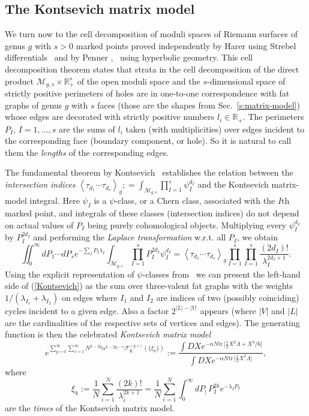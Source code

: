 \documentclass[11pt]{article}
\def\tr{{\mathrm{tr\,}}}
\def\beq{\begin{equation}}
\def\eeq{\end{equation}}
\theoremstyle{plain}
\theoremstyle{definition}
\let\text=\mathrm
\def\beq{\begin{equation}}
\def\eeq{\end{equation}}
\begin{document}
\subsection{The Kontsevich matrix model}\label{ss:Kontsevich}

We turn now to the cell decomposition of moduli spaces of Riemann surfaces of genus $g$ with
$s>0$ marked points proved independently by Harer \cite{HarVir} using Strebel differentials~\cite{Strebel} and by Penner \cite{Penner},~\cite{PenPer} using hyperbolic geometry.  This cell decomposition theorem
states that strata in the cell decomposition of the direct
product ${\mathcal M}_{g,s}\times {\mathbb R}^s_{+}$ of the open moduli space and the $s$-dimensional space of
strictly positive perimeters of holes
are in one-to-one correspondence with fat graphs of genus $g$ with $s$ faces (those are the shapes from
Sec.~\ref{s:matrix-model}) whose edges are decorated with strictly positive numbers $l_i\in {\mathbb R}_{+}$.
The perimeters $P_I$, $I=1,\dots,s$ are the sums of $l_i$ taken (with multiplicities) over edges incident to the
corresponding face (boundary component, or hole).  So it is natural to call them the {\em lengths} of the corresponding edges.


The fundamental theorem by Kontsevich~\cite{Kon88} establishes the relation between the
\emph{intersection indices} $\left\langle\tau_{d_1}\cdots\tau_{d_s}\right\rangle_g;=\int_{\overline{\mathcal M}_{g,s}}\prod_{I=1}^s \psi_I^{d_I}$ and the Kontsevich matrix-model integral. Here $\psi_I$ is a $\psi$-class, or a Chern class, associated with the
$I$th marked point, and integrals of these classes (intersection indices) do not depend on  actual values of $P_I$ being purely cohomological objects.
Multiplying every $\psi_I^{d_I}$ by
$P_I^{2d_I}$ and performing the {\em Laplace transformation} w.r.t. all $P_I$,  we obtain
\beq
\iint_0^\infty dP_1\cdots dP_s e^{-\sum_I P_I\lambda_I}
\int_{\overline{\mathcal M}_{g,s}}\prod_{I=1}^s P_I^{2d_I}\psi_I^{d_I}=
\left\langle\tau_{d_1}\cdots\tau_{d_s}\right\rangle_g \prod_{I=1}^s \prod_{I=1}^s \frac{(2d_I)!}{\lambda_I^{2d_I+1}}.
\label{Kontsevich}
\eeq
Using the explicit representation of $\psi$-classes from~\cite{Kon88} we can present
the left-hand side of (\ref{Kontsevich}) as the sum over three-valent fat graphs with the
weights $1/(\lambda_{I_1}+\lambda_{I_2})$ on edges where $I_1$ and $I_2$ are indices of two (possibly coinciding)
cycles incident to a given edge. Also a factor $2^{|L|-|V|}$ appears (where $|V|$ and $|L|$ are the cardinalities
of the respective sets of vertices and edges).
The generating function is then the celebrated {\em Kontsevich matrix model}
\beq
e^{\sum_{g=0}^\infty\sum_{s=1}^\infty N^{2-2g}\alpha^{2-2g-s} {\mathcal F}^{(g,s)}_{\text{K}}(\{\xi_k\})}:=
\frac{\int DX e^{-\alpha N\tr\bigl[\frac12 X^2\Lambda +X^3/6 \bigr]}}
{\int DX e^{-\alpha N\tr\bigl[\frac12 X^2\Lambda\bigr]}},
\label{Kont}
\eeq
where
\beq
\xi_k:=\frac1N\sum_{i=1}^N\frac{(2k)!}{\lambda_i^{2k+1}} 
=\frac1N\sum_{i=1}^N\int_0^\infty dP_|\,P_I^{2k}e^{-\lambda_IP_I}
\label{times-K}
\eeq
are the {\em times} of the Kontsevich matrix model.
\end{document}
